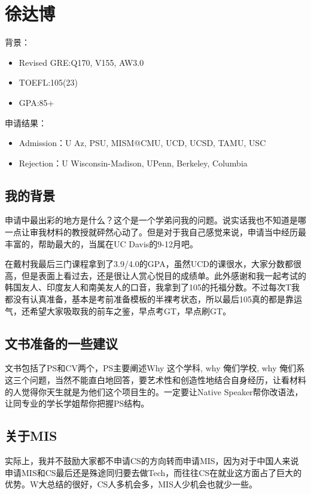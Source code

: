\section{徐达博}
背景：
\begin{itemize}
\item Revised GRE:Q170, V155, AW3.0
\item TOEFL:105(23)
\item GPA:85+
\end{itemize}
\par
申请结果：
\begin{itemize}
\item Admission：U Az, PSU, MISM@CMU, UCD, UCSD, TAMU, USC
\item Rejection：U Wisconsin-Madison, UPenn, Berkeley, Columbia
\end{itemize}
\par

\subsection{我的背景}
申请中最出彩的地方是什么？这个是一个学弟问我的问题。说实话我也不知道是哪一点让审我材料的教授就砰然心动了。但是对于我自己感觉来说，申请当中经历最丰富的，帮助最大的，当属在UC Davis的9-12月吧。\par

在戴村我最后三门课程拿到了3.9/4.0的GPA，虽然UCD的课很水，大家分数都很高，但是表面上看过去，还是很让人赏心悦目的成绩单。此外感谢和我一起考试的韩国友人、印度友人和南美友人的口音，我拿到了105的托福分数。不过每次T我都没有认真准备，基本是考前准备模板的半裸考状态，所以最后105真的都是靠运气，还希望大家吸取我的前车之鉴，早点考GT，早点刷GT。

\subsection{文书准备的一些建议}
文书包括了PS和CV两个，PS主要阐述Why 这个学科, why 俺们学校, why 俺们系这三个问题，当然不能直白地回答，要艺术性和创造性地结合自身经历，让看材料的人觉得你天生就是为他们这个项目生的。一定要让Native Speaker帮你改语法，让同专业的学长学姐帮你把握PS结构。

\subsection{关于MIS}
实际上，我并不鼓励大家都不申请CS的方向转而申请MIS，因为对于中国人来说申请MIS和CS最后还是殊途同归要去做Tech，而往往CS在就业这方面占了巨大的优势。W大总结的很好，CS人多机会多，MIS人少机会也就少一些。\par

